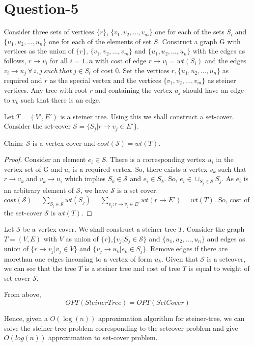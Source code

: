 \documentclass{article}
\begin{document}
\section{Question-5}
Consider three sets of vertices $\{r\}$, $\{v_1,v_2,\ldots,v_m\}$ one for each of the sets $S_i$ and $\{u_1,u_2,\ldots,u_n\}$ one for each of the elements of set $S$. Construct a graph G with vertices as the union of $\{r\}$, $\{v_1,v_2,\ldots,v_m\}$ and $\{u_1,u_2,\ldots,u_n\}$ with the edges as follows, $r \rightarrow v_i$ for all $i=1..n$ with cost of edge $r \rightarrow v_i = wt(S_i)$ and the edges $v_i \rightarrow u_j \ \forall\ i,j\ such\ that\ j\in S_i$ of cost 0. Set the vertices $r,\{u_1,u_2,\ldots,u_n\}$ as required and $r$ as the special vertex and the vertices $\{v_1,v_2,\ldots,v_m\}$ as steiner vertices. Any tree with root $r$ and containing the vertex $u_j$ should have an edge to $v_k$ such that there is an edge. 

\noindent
Let $T = (V',E')$ is a steiner tree. Using this we shall construct a set-cover. Consider the set-cover $ \mathcal{S} = \{S_j| r \rightarrow v_j \in E'\}$.

\noindent
Claim: $\mathcal{S}$ is a vertex cover and $cost(\mathcal{S}) = wt(T)$.
\begin{proof}
Consider an element $e_i \in S$. There is a corresponding vertex
$u_i$ in the vertex set of G and $u_i$ is a required vertex. So, there exists a vertex $v_k$ such that $r \rightarrow v_k$ and $v_k \rightarrow u_i$ which implies $S_k \in \mathcal{S}$  and $e_i \in S_k$. So, $e_i \in \cup_{S_j \in \mathcal{S}}S_j$. As $e_i$ is an arbitrary element of $\mathcal{S}$, we have $\mathcal{S}$ is a set cover. $cost(\mathcal{S}) = \sum_{S_j \in \mathcal{S}}wt(S_j) = \sum_{v_j: r \rightarrow v_j \in E'}wt(r \rightarrow E') = wt(T)$. So, cost of the set-cover $\mathcal{S}$ is $wt(T)$.
\end{proof}

Let $\mathcal{S}$ be a vertex cover. We shall construct a steiner tree $T$. Consider the graph $T = (V,E)$ with $V$ as union of $\{r\}$,$\{v_j | S_j \in \mathcal{S}\}$ and $\{u_1,u_2,\ldots,u_n\}$ and edges as union of $\{r \rightarrow v_j | v_j \in V\}$ and $\{v_j \rightarrow u_k| e_k \in S_j\}$. Remove edges if there are morethan one edges incoming to a vertex of form $u_k$. Given that $\mathcal{S}$ is a setcover, we can see that the tree $T$ is a steiner tree and cost of tree $T$ is equal to weight of set cover $\mathcal{S}$.

From above,
\begin{equation}
    OPT(Steiner Tree) = OPT(Set Cover)
\end{equation}

Hence, given a $O(\log(n))$ approximation algorithm for steiner-tree, we can solve the steiner tree problem corresponding to the setcover problem and give $O(log(n))$ approximation to set-cover problem.
\end{document}
